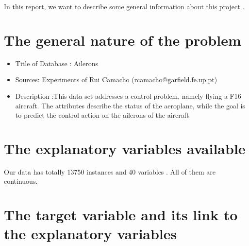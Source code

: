\documentclass[12pt]{article}
\title{\color{blue}{Statistical Analysis and Description}}
\author{Zeyu CHEN and Clement VEYSSIERE}
\date{November 11 2018}                                           %
\begin{document}
\maketitle 

In this report, we want to describe some general information about this project .
\section{The general nature of the problem} 
	\begin{itemize}[label=-]
	\item Title of Database : Ailerons \\
	
	\item Sources: Experiments of Rui Camacho (rcamacho@garfield.fe.up.pt)\\ 
	
	\item Description :This data set addresses a control problem, namely flying a F16 aircraft. The attributes describe the status of the aeroplane, while the goal is to predict the control action on the ailerons of the aircraft\\

	\end{itemize}
 
 
\section{The explanatory variables available} 
        Our data has totally 13750 instances and 40 variables . All of them are continuous. 

\section{The target variable and its link to the explanatory variables} 




\end{document}
